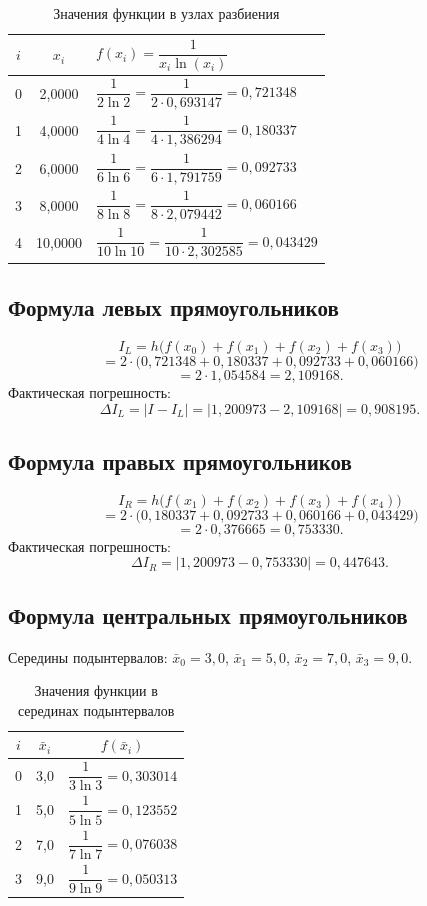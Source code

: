 \documentclass[a4paper, final]{article}
\begin{document}
\begin{table}[h!]
\centering
\caption{Значения функции в узлах разбиения}
\label{tab:s1_nodes}
\begin{tabular}{|c|c|l|}
\hline
$i$ & $x_i$ & $f(x_i) = \dfrac{1}{x_i\ln(x_i)}$ \\
\hline
0 & 2,0000 & $\dfrac{1}{2\ln 2} = \dfrac{1}{2 \cdot 0{,}693147} = 0{,}721348$ \\
1 & 4,0000 & $\dfrac{1}{4\ln 4} = \dfrac{1}{4 \cdot 1{,}386294} = 0{,}180337$ \\
2 & 6,0000 & $\dfrac{1}{6\ln 6} = \dfrac{1}{6 \cdot 1{,}791759} = 0{,}092733$ \\
3 & 8,0000 & $\dfrac{1}{8\ln 8} = \dfrac{1}{8 \cdot 2{,}079442} = 0{,}060166$ \\
4 & 10,0000 & $\dfrac{1}{10\ln 10} = \dfrac{1}{10 \cdot 2{,}302585} = 0{,}043429$ \\
\hline
\end{tabular}
\end{table}

\subsection{Формула левых прямоугольников}

\[
I_L = h\bigl(f(x_0)+f(x_1)+f(x_2)+f(x_3)\bigr)
\]
\[
= 2 \cdot\bigl(0{,}721348+0{,}180337+0{,}092733+0{,}060166\bigr)
\]
\[
= 2 \cdot 1{,}054584 = 2{,}109168.
\]
Фактическая погрешность:
\[
\Delta I_L = |I - I_L| = |1{,}200973 - 2{,}109168| = 0{,}908195.
\]

\subsection{Формула правых прямоугольников}

\[
I_R = h\bigl(f(x_1)+f(x_2)+f(x_3)+f(x_4)\bigr)
\]
\[
= 2 \cdot\bigl(0{,}180337+0{,}092733+0{,}060166+0{,}043429\bigr)
\]
\[
= 2 \cdot 0{,}376665 = 0{,}753330.
\]
Фактическая погрешность:
\[
\Delta I_R = |1{,}200973 - 0{,}753330| = 0{,}447643.
\]

\subsection{Формула центральных прямоугольников}

Середины подынтервалов: $\bar x_0 = 3{,}0$, $\bar x_1 = 5{,}0$,
$\bar x_2 = 7{,}0$, $\bar x_3 = 9{,}0$.

\begin{table}[h!]
\centering
\caption{Значения функции в серединах подынтервалов}
\label{tab:s1_mid}
\begin{tabular}{|c|c|c|}
\hline
$i$ & $\bar x_i$ & $f(\bar x_i)$ \\
\hline
0 & 3,0 & $\dfrac{1}{3\ln 3} = 0{,}303014$ \\
1 & 5,0 & $\dfrac{1}{5\ln 5} = 0{,}123552$ \\
2 & 7,0 & $\dfrac{1}{7\ln 7} = 0{,}076038$ \\
3 & 9,0 & $\dfrac{1}{9\ln 9} = 0{,}050313$ \\
\hline
\end{tabular}
\end{table}
\end{document}
